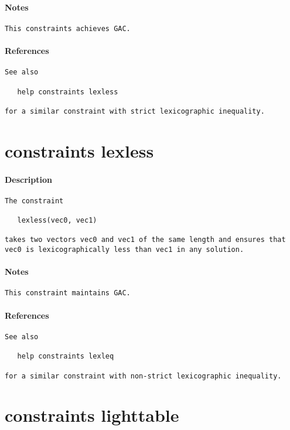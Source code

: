 \paragraph{Notes}
{\footnotesize
\begin{verbatim}
This constraints achieves GAC.
\end{verbatim}
}
\paragraph{References}
{\footnotesize
\begin{verbatim}
See also

   help constraints lexless

for a similar constraint with strict lexicographic inequality.
\end{verbatim}
}
\section{constraints lexless}
\paragraph{Description}
{\footnotesize
\begin{verbatim}
The constraint

   lexless(vec0, vec1)

takes two vectors vec0 and vec1 of the same length and ensures that
vec0 is lexicographically less than vec1 in any solution.
\end{verbatim}
}
\paragraph{Notes}
{\footnotesize
\begin{verbatim}
This constraint maintains GAC.
\end{verbatim}
}
\paragraph{References}
{\footnotesize
\begin{verbatim}
See also

   help constraints lexleq

for a similar constraint with non-strict lexicographic inequality.
\end{verbatim}
}
\section{constraints lighttable}
